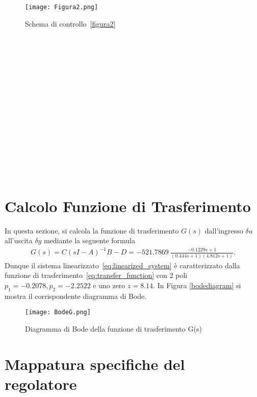 \documentclass[a4paper, 11pt]{article}
\begin{document}
%
\begin{figure}[h!]
    \centering
    \texttt{[image: Figura2.png]}
    \caption{Schema di controllo~\eqref{figura2}}
    \label{figura2}
\end{figure}
\\ \\ \\ \\ \\ \\ \\ \\ \\ \\ \\ \\ \\ \\ 
\section{Calcolo Funzione di Trasferimento}

In questa sezione, si calcola la funzione di trasferimento $G(s)$ dall'ingresso $\delta u$ all'uscita $\delta y$ mediante la seguente formula 
%
%
\begin{align}\label{eq:transfer_function}
G(s) = C(sI-A)^{-1}B-D = -521.7869\ \frac{-0.1229s+1}{(0.444s+1)(4.812s+1)}.
\end{align}
%
Dunque il sistema linearizzato~\eqref{eq:linearized_system} è caratterizzato dalla funzione di trasferimento~\eqref{eq:transfer_function} con 2 poli \\ $p_1 = -0.2078,  p_2=-2.2522$ e uno zero $z = 8.14$. In Figura \eqref{bodediagram} si mostra il corrispondente diagramma di Bode. 

\begin{figure}[h!]
    \centering
    \texttt{[image: BodeG.png]}
    \caption{Diagramma di Bode della funzione di trasferimento G(s)}
    \label{bodediagram}
\end{figure}


\section{Mappatura specifiche del regolatore}
\label{sec:specifications}
\end{document}
